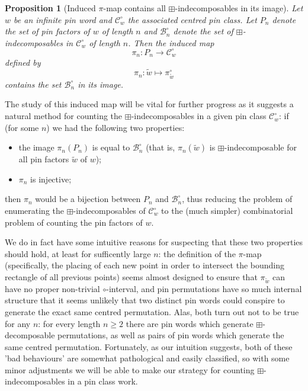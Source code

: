 \documentclass[11pt,a4paper]{article}
\newtheorem{prop}[thm]{Proposition}
\theoremstyle{definition}
\begin{document}
\begin{prop}[Induced $\pi$-map contains all $\boxplus$-indecomposables in its image]
Let $w$ be an infinite pin word and $\mathcal{C}^{\circ}_{w}$ the associated centred pin class. Let $P_{n}$ denote the set of pin factors of $w$ of length $n$ and $\mathcal{B}^{\circ}_{n}$ denote the set of $\boxplus$-indecomposables in $\mathcal{C}^{\circ}_{w}$ of length $n$. Then the induced map
\[
\pi_{n}: P_{n} \rightarrow \mathcal{C}^{\circ}_{w}
\]
defined by 
\[
\pi_{n}: \tilde{w} \mapsto \pi^{\circ}_{\tilde{w}}
\]
contains the set $\mathcal{B}^{\circ}_{n}$ in its image.
\end{prop}

The study of this induced map will be vital for further progress as it suggests a natural method for counting the $\boxplus$-indecomposables in a given pin class $\mathcal{C}^{\circ}_{w}$: if (for some $n$) we had the following two properties:
\begin{itemize}
\item the image $\pi_{n}(P_{n})$ is equal to $\mathcal{B}^{\circ}_{n}$ (that is, $\pi_{n}(\tilde{w})$ is $\boxplus$-indecomposable for all pin factors $\tilde{w}$ of $w$);
\item $\pi_{n}$ is injective;
\end{itemize}
then $\pi_{n}$ would be a bijection between $P_{n}$ and $\mathcal{B}^{\circ}_{n}$, thus reducing the problem of enumerating the $\boxplus$-indecomposables of $\mathcal{C}^{\circ}_{w}$ to the (much simpler) combinatorial problem of counting the pin factors of $w$.

We do in fact have some intuitive reasons for suspecting that these two properties should hold, at least for sufficently large $n$: the definition of the $\pi$-map (specifically, the placing of each new point in order to intersect the bounding rectangle of all previous points) seems almost designed to ensure that $\pi_{\widetilde{w}}$ can have no proper non-trivial $\circ$-interval, and pin permutations have so much internal structure that it seems unlikely that two distinct pin words could conspire to generate the exact same centred permutation. Alas, both turn out not to be true for any $n$: for every length $n \geq 2$ there are pin words which generate $\boxplus$-decomposable permutations, as well as pairs of pin words which generate the same centred permutation. Fortunately, as our intuition suggests, both of these 'bad behaviours' are somewhat pathological and easily classified, so with some minor adjustments we will be able to make our strategy for counting $\boxplus$-indecomposables in a pin class work.
\end{document}
